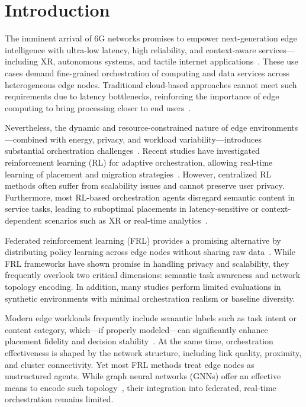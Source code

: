 \section{Introduction}

The imminent arrival of 6G networks promises to empower next-generation edge intelligence with ultra-low latency, high reliability, and context-aware services—including XR, autonomous systems, and tactile internet applications~\cite{Lou2022_CostEffectiveScheduling, Wang2025_AverageReliabilityOptimal}. These use cases demand fine-grained orchestration of computing and data services across heterogeneous edge nodes. Traditional cloud-based approaches cannot meet such requirements due to latency bottlenecks, reinforcing the importance of edge computing to bring processing closer to end users~\cite{Xu2023_FedLC}.

Nevertheless, the dynamic and resource-constrained nature of edge environments—combined with energy, privacy, and workload variability—introduces substantial orchestration challenges~\cite{Yuan2025}. Recent studies have investigated reinforcement learning (RL) for adaptive orchestration, allowing real-time learning of placement and migration strategies~\cite{Yuan2025}. However, centralized RL methods often suffer from scalability issues and cannot preserve user privacy. Furthermore, most RL-based orchestration agents disregard semantic content in service tasks, leading to suboptimal placements in latency-sensitive or context-dependent scenarios such as XR or real-time analytics~\cite{Yu2025}.

Federated reinforcement learning (FRL) provides a promising alternative by distributing policy learning across edge nodes without sharing raw data~\cite{Chen2025_FRL}. While FRL frameworks have shown promise in handling privacy and scalability, they frequently overlook two critical dimensions: semantic task awareness and network topology encoding. In addition, many studies perform limited evaluations in synthetic environments with minimal orchestration realism or baseline diversity.

Modern edge workloads frequently include semantic labels such as task intent or content category, which—if properly modeled—can significantly enhance placement fidelity and decision stability~\cite{Wu2024_FRLEdgeComputing}. At the same time, orchestration effectiveness is shaped by the network structure, including link quality, proximity, and cluster connectivity. Yet most FRL methods treat edge nodes as unstructured agents. While graph neural networks (GNNs) offer an effective means to encode such topology~\cite{Sagar2025_HAFedRL}, their integration into federated, real-time orchestration remains limited.

